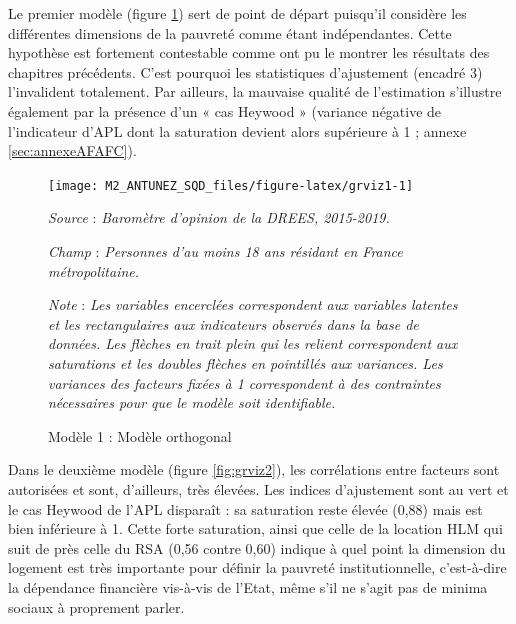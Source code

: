 \documentclass[12pt,a4paper]{reedthesis}
\begin{document}
Le premier modèle (figure \ref{fig:grviz1}) sert de point de départ puisqu'il considère les différentes dimensions de la pauvreté comme étant indépendantes. Cette hypothèse est fortement contestable comme ont pu le montrer les résultats des chapitres précédents. C'est pourquoi les statistiques d'ajustement (encadré 3) l'invalident totalement. Par ailleurs, la mauvaise qualité de l'estimation s'illustre également par la présence d'un « cas Heywood » (variance négative de l'indicateur d'APL dont la saturation devient alors supérieure à 1 ; annexe \ref{sec:annexeAFAFC}).
\begin{figure}[!ht]

{\centering \texttt{[image: M2\_ANTUNEZ\_SQD\_files/figure-latex/grviz1-1]} 

}

\caption[Modèle 1 ]{Modèle 1 : Modèle orthogonal}\label{fig:grviz1}

\footnotesize


\emph{Source} : \emph{Baromètre d’opinion de la DREES, 2015-2019.}


\emph{Champ} : \emph{Personnes d’au moins 18 ans résidant en France métropolitaine.}


\emph{Note} : \emph{Les variables encerclées correspondent aux variables latentes et les rectangulaires aux indicateurs observés dans la base de données. Les flèches en trait plein qui les relient correspondent aux saturations et les doubles flèches en pointillés aux variances. Les variances des facteurs fixées à 1 correspondent à des contraintes nécessaires pour que le modèle soit identifiable.}
\normalsize\end{figure}

Dans le deuxième modèle (figure \ref{fig:grviz2}), les corrélations entre facteurs sont autorisées et sont, d'ailleurs, très élevées. Les indices d'ajustement sont au vert et le cas Heywood de l'APL disparaît : sa saturation reste élevée (0,88) mais est bien inférieure à 1. Cette forte saturation, ainsi que celle de la location HLM qui suit de près celle du RSA (0,56 contre 0,60) indique à quel point la dimension du logement est très importante pour définir la pauvreté institutionnelle, c'est-à-dire la dépendance financière vis-à-vis de l'Etat, même s'il ne s'agit pas de minima sociaux à proprement parler.
\end{document}
